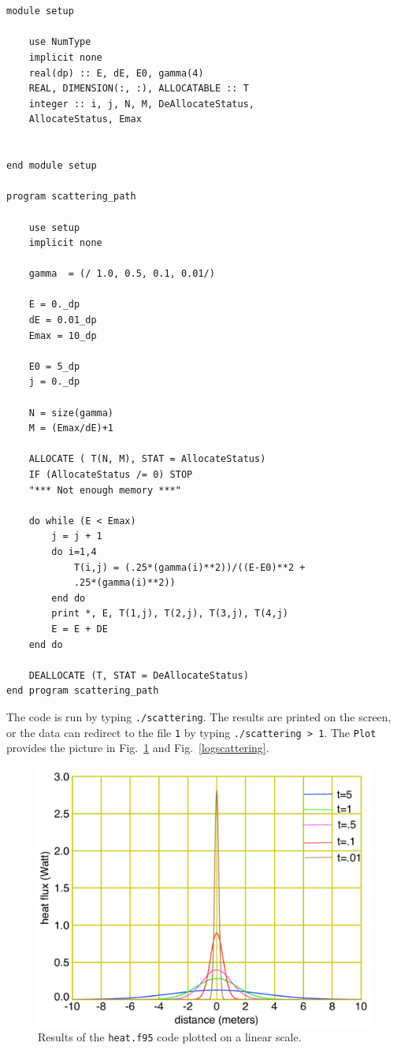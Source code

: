 \documentclass[12pt]{article}
\begin{document}
\begin{lstlisting}[frame=single,caption={The {\tt scattering.f95}},label=scattering95]


module setup

	use NumType
	implicit none
	real(dp) :: E, dE, E0, gamma(4)
	REAL, DIMENSION(:, :), ALLOCATABLE :: T
	integer :: i, j, N, M, DeAllocateStatus,
	AllocateStatus, Emax
	

end module setup

program scattering_path

	use setup
	implicit none
	
	gamma  = (/ 1.0, 0.5, 0.1, 0.01/) 

	E = 0._dp
	dE = 0.01_dp
	Emax = 10_dp

	E0 = 5_dp	
	j = 0._dp		

	N = size(gamma)
	M = (Emax/dE)+1

	ALLOCATE ( T(N, M), STAT = AllocateStatus)
	IF (AllocateStatus /= 0) STOP 
	"*** Not enough memory ***"
		
	do while (E < Emax)
		j = j + 1
		do i=1,4
			T(i,j) = (.25*(gamma(i)**2))/((E-E0)**2 + 
			.25*(gamma(i)**2))
		end do
		print *, E, T(1,j), T(2,j), T(3,j), T(4,j)
		E = E + DE
	end do 
		
	DEALLOCATE (T, STAT = DeAllocateStatus)
end program scattering_path

\end{lstlisting}


The code is run by typing {\tt ./scattering}. The results are printed on the screen, or the data can redirect to the file {\tt 1} by typing {\tt ./scattering > 1}. The {\tt Plot} provides the picture in Fig.\ \ref{linearscattering} and Fig.\ \ref{logscattering}. 


\begin{figure}[!htb]
\includegraphics[width=1.\textwidth]{stufflinear.pdf}
\caption{Results of the {\tt heat.f95} code plotted on a linear scale. }
\label{linearscattering}
\end{figure}
\end{document}
